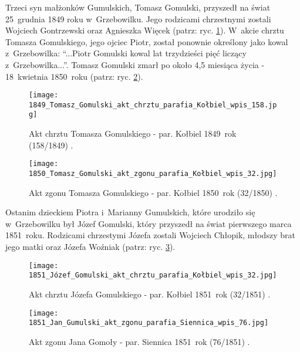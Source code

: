 Trzeci syn małżonków Gumulskich, Tomasz Gomulski, przyszedł na świat 
25~grudnia 1849 roku w~Grzebowilku. Jego rodzicami chrzestnymi zostali 
Wojciech Gontrzewski oraz Agnieszka Więcek (patrz: ryc. 
\ref{fig:tgomulski_1849}). W~akcie chrztu Tomasza Gomulskiego, jego ojciec 
Piotr, został ponownie określony jako kowal z~Grzebowilka: \enquote{...Piotr 
Gomulski kowal lat trzydzieści pięć liczący z~Grzebowilka...}. Tomasz 
Gomulski zmarł po około 4,5 miesiąca życia - 18~kwietnia 1850~roku (patrz: 
ryc. \ref{fig:tgomulski_1850}).

\begin{figure}[!ht]
    \vspace*{0.5cm}
    \centering \texttt{[image: 
        1849\_Tomasz\_Gomulski\_akt\_chrztu\_parafia\_Kołbiel\_wpis\_158.jpg]}
    \captionsetup{format=hang}
    \caption{Akt chrztu Tomasza Gomulskiego - par. Kołbiel 1849~rok 
    (158/1849) \cite{par_kolbiel2}.}
    \label{fig:tgomulski_1849}
\end{figure}

\begin{figure}[!ht]
    \vspace*{0.5cm}
    \centering \texttt{[image: 
        1850\_Tomasz\_Gomulski\_akt\_zgonu\_parafia\_Kołbiel\_wpis\_32.jpg]}
    \captionsetup{format=hang}
    \caption{Akt zgonu Tomasza Gomulskiego - par. Kołbiel 1850~rok 
    (32/1850) \cite{par_kolbiel2}.}
    \label{fig:tgomulski_1850}
\end{figure}

Ostanim dzieckiem Piotra i~Marianny Gumulskich, które urodziło się 
w~Grzebowilku był Józef Gomulski, który przyszedł na świat pierwszego marca 
1851~roku. Rodzicami chrzestymi Józefa zostali Wojciech Chłopik, młodszy brat 
jego matki oraz Józefa Woźniak (patrz: ryc. \ref{fig:jgomulski_1851}).

\begin{figure}[!ht]
    \vspace*{0.5cm}
    \centering \texttt{[image: 
        1851\_Józef\_Gomulski\_akt\_chrztu\_parafia\_Kołbiel\_wpis\_32.jpg]}
    \captionsetup{format=hang}
    \caption{Akt chrztu Józefa Gomulskiego - par. Kołbiel 1851~rok 
    (32/1851) \cite{par_kolbiel2}.}
    \label{fig:jgomulski_1851}
\end{figure}

\begin{figure}[!ht]
    \vspace*{0.5cm}
    \centering \texttt{[image: 
        1851\_Jan\_Gumulski\_akt\_zgonu\_parafia\_Siennica\_wpis\_76.jpg]}
    \captionsetup{format=hang}
    \caption{Akt zgonu Jana Gomoły - par. Siennica 1851~rok 
    (76/1851) \cite{par_siennica}.}
    \label{fig:jangomulski_1851}
\end{figure}

